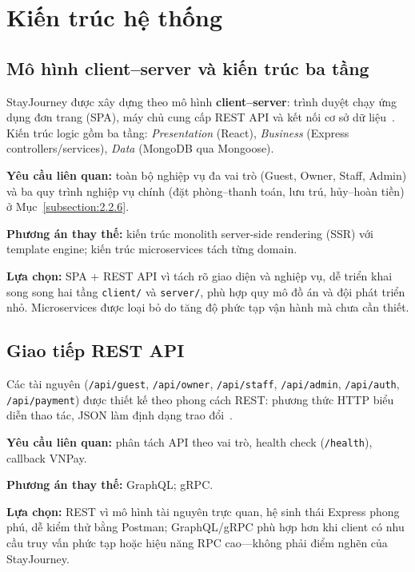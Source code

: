 \documentclass[../DoAn.tex]{subfiles}
\begin{document}
\section{Kiến trúc hệ thống}
\label{section:3.2}

\subsection{Mô hình client--server và kiến trúc ba tầng}

StayJourney được xây dựng theo mô hình \textbf{client--server}: trình duyệt chạy ứng dụng đơn trang (SPA), máy chủ cung cấp REST API và kết nối cơ sở dữ liệu~\cite{fielding2000rest}. Kiến trúc logic gồm ba tầng: \textit{Presentation} (React), \textit{Business} (Express controllers/services), \textit{Data} (MongoDB qua Mongoose).

\textbf{Yêu cầu liên quan:} toàn bộ nghiệp vụ đa vai trò (Guest, Owner, Staff, Admin) và ba quy trình nghiệp vụ chính (đặt phòng--thanh toán, lưu trú, hủy--hoàn tiền) ở Mục~\ref{subsection:2.2.6}.

\textbf{Phương án thay thế:} kiến trúc monolith server-side rendering (SSR) với template engine; kiến trúc microservices tách từng domain.

\textbf{Lựa chọn:} SPA + REST API vì tách rõ giao diện và nghiệp vụ, dễ triển khai song song hai tầng \texttt{client/} và \texttt{server/}, phù hợp quy mô đồ án và đội phát triển nhỏ. Microservices được loại bỏ do tăng độ phức tạp vận hành mà chưa cần thiết.

\subsection{Giao tiếp REST API}

Các tài nguyên (\texttt{/api/guest}, \texttt{/api/owner}, \texttt{/api/staff}, \texttt{/api/admin}, \texttt{/api/auth}, \texttt{/api/payment}) được thiết kế theo phong cách REST: phương thức HTTP biểu diễn thao tác, JSON làm định dạng trao đổi~\cite{fielding2000rest}.

\textbf{Yêu cầu liên quan:} phân tách API theo vai trò, health check (\texttt{/health}), callback VNPay.

\textbf{Phương án thay thế:} GraphQL; gRPC.

\textbf{Lựa chọn:} REST vì mô hình tài nguyên trực quan, hệ sinh thái Express phong phú, dễ kiểm thử bằng Postman; GraphQL/gRPC phù hợp hơn khi client có nhu cầu truy vấn phức tạp hoặc hiệu năng RPC cao---không phải điểm nghẽn của StayJourney.
\end{document}
